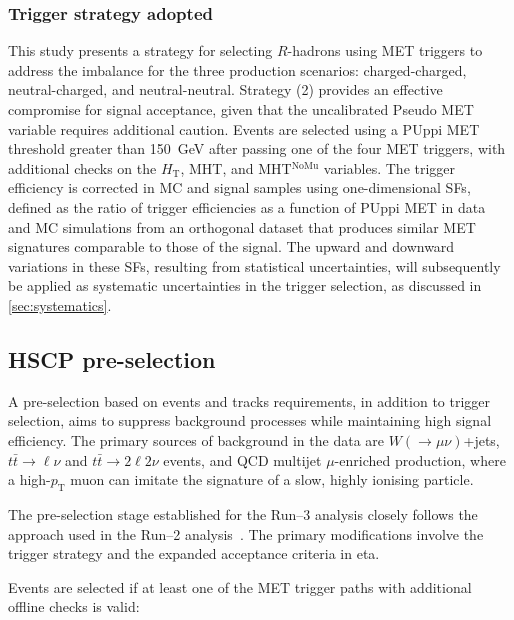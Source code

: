 \subsubsection{Trigger strategy adopted}

This study presents a strategy for selecting $R$-hadrons using MET triggers to address the imbalance for the three production scenarios: charged-charged, neutral-charged, and neutral-neutral. Strategy (2) provides an effective compromise for signal acceptance, given that the uncalibrated Pseudo MET variable requires additional caution. Events are selected using a PUppi MET threshold greater than 150~GeV after passing one of the four MET triggers, with additional checks on the $H_{\mathrm{T}}$, MHT, and MHT$^\mathrm{NoMu}$ variables. The trigger efficiency is corrected in MC and signal samples using one-dimensional SFs, defined as the ratio of trigger efficiencies as a function of PUppi MET in data and MC simulations from an orthogonal dataset that produces similar MET signatures comparable to those of the signal. The upward and downward variations in these SFs, resulting from statistical uncertainties, will subsequently be applied as systematic uncertainties in the trigger selection, as discussed in \cref{sec:systematics}.

\newpage

\subsection{HSCP pre-selection}
\label{sec:preselection}

A pre-selection based on events and tracks requirements, in addition to trigger selection, aims to suppress background processes while maintaining high signal efficiency. The primary sources of background in the data are $W(\to \mu\nu)$+jets, $t\bar{t}\to \ell \nu$ and $t\bar{t}\to 2\ell 2\nu$ events, and QCD multijet $\mu$-enriched production, where a high-$p_{\mathrm{T}}$ muon can imitate the signature of a slow, highly ionising particle.

The pre-selection stage established for the Run--3 analysis closely follows the approach used in the Run--2 analysis~\cite{HSCP_Run2}. The primary modifications involve the trigger strategy and the expanded acceptance criteria in eta.

\vspace{0.5 cm}

Events are selected if at least one of the MET trigger paths with additional offline checks is valid:

